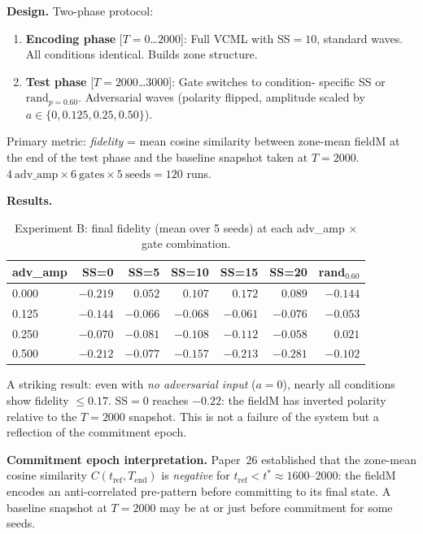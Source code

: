 \documentclass[11pt,a4paper]{article}
\begin{document}
\textbf{Design.}  Two-phase protocol:
\begin{enumerate}
  \item \textbf{Encoding phase} [$T = 0$\ldots$2000$]: Full VCML with SS$=10$,
        standard waves.  All conditions identical.  Builds zone structure.
  \item \textbf{Test phase} [$T = 2000$\ldots$3000$]: Gate switches to condition-
        specific SS or $\text{rand}_{p=0.60}$.  Adversarial waves (polarity
        flipped, amplitude scaled by $a \in \{0, 0.125, 0.25, 0.50\}$).
\end{enumerate}
Primary metric: \emph{fidelity} = mean cosine similarity between zone-mean
fieldM at the end of the test phase and the baseline snapshot taken at $T=2000$.
$4\ \text{adv\_amp} \times 6\ \text{gates} \times 5\ \text{seeds} = 120$ runs.

\textbf{Results.}

\begin{table}[h]
\centering
\caption{Experiment B: final fidelity (mean over 5 seeds) at each
         adv\_amp $\times$ gate combination.}
\label{tab:expb}
\begin{tabular}{lrrrrrr}
\toprule
adv\_amp & SS=0 & SS=5 & SS=10 & SS=15 & SS=20 & rand$_{0.60}$ \\
\midrule
0.000 & $-0.219$ & $ 0.052$ & $ 0.107$ & $ 0.172$ & $ 0.089$ & $-0.144$ \\
0.125 & $-0.144$ & $-0.066$ & $-0.068$ & $-0.061$ & $-0.076$ & $-0.053$ \\
0.250 & $-0.070$ & $-0.081$ & $-0.108$ & $-0.112$ & $-0.058$ & $ 0.021$ \\
0.500 & $-0.212$ & $-0.077$ & $-0.157$ & $-0.213$ & $-0.281$ & $-0.102$ \\
\bottomrule
\end{tabular}
\end{table}

A striking result: even with \emph{no adversarial input} ($a=0$), nearly all
conditions show fidelity $\leq 0.17$.  SS$=0$ reaches $-0.22$: the fieldM has
inverted polarity relative to the $T=2000$ snapshot.  This is not a failure of
the system but a reflection of the commitment epoch.

\textbf{Commitment epoch interpretation.}  Paper~26 established that the
zone-mean cosine similarity $C(t_\text{ref}, T_\text{end})$ is \emph{negative}
for $t_\text{ref} < t^* \approx 1600$--$2000$: the fieldM encodes an
anti-correlated pre-pattern before committing to its final state.  A baseline
snapshot at $T=2000$ may be at or just before commitment for some seeds.
\end{document}
